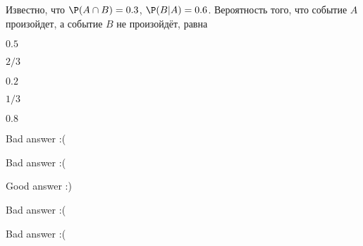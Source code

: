 
\begin{question}
Известно, что \(\P(A\cap B)= 0.3\), \(\P(B|A)=0.6\). Вероятность того,
что событие \(A\) произойдет, а событие \(B\) не произойдёт, равна
\begin{answerlist}
  \item \(0.5\)
  \item \(2/3\)
  \item \(0.2\)
  \item \(1/3\)
  \item \(0.8\)
\end{answerlist}
\end{question}

\begin{solution}
\begin{answerlist}
  \item Bad answer :(
  \item Bad answer :(
  \item Good answer :)
  \item Bad answer :(
  \item Bad answer :(
\end{answerlist}
\end{solution}

